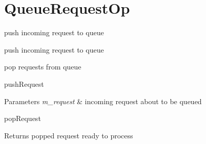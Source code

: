 \hypertarget{group__QueueRequestOp}{}\section{Queue\+Request\+Op}
\label{group__QueueRequestOp}


push incoming request to queue  


push incoming request to queue 

pop requests from queue

push\+Request 
\begin{DoxyParams}{Parameters}
{\em m\+\_\+request} & incoming request about to be queued\\
\hline
\end{DoxyParams}
pop\+Request \begin{DoxyReturn}{Returns}
popped request ready to process 
\end{DoxyReturn}
